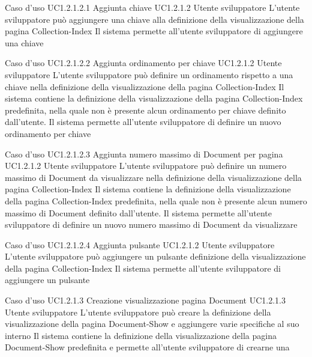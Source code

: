 \UCtitle
{Caso d'uso UC1.2.1.2.1}
{Aggiunta chiave}
\UC
{UC1.2.1.2}
{Utente sviluppatore}
{L'utente sviluppatore  può aggiungere una chiave alla definizione della visualizzazione della pagina Collection-Index}
{Il sistema permette all'utente  sviluppatore di aggiungere una chiave}


\UCtitle
{Caso d'uso UC1.2.1.2.2}
{Aggiunta ordinamento per chiave}
\UC
{UC1.2.1.2}
{Utente sviluppatore}
{L'utente sviluppatore  può  definire un ordinamento rispetto a una chiave nella definizione della visualizzazione della pagina Collection-Index}
{Il sistema contiene la definizione della visualizzazione della pagina Collection-Index predefinita, nella quale non è presente alcun ordinamento per chiave definito dall'utente. Il sistema permette all'utente  sviluppatore di definire un nuovo ordinamento per chiave}

\UCtitle
{Caso d'uso UC1.2.1.2.3}
{Aggiunta numero massimo di Document per pagina}
\UC
{UC1.2.1.2}
{Utente sviluppatore}
{L'utente sviluppatore  può definire un numero massimo di Document da visualizzare nella definizione della visualizzazione della pagina Collection-Index}
{Il sistema contiene la definizione della visualizzazione della pagina Collection-Index predefinita, nella quale non è presente alcun numero massimo di Document definito dall'utente. Il sistema permette all'utente  sviluppatore di definire un nuovo numero massimo di Document da visualizzare}

\UCtitle
{Caso d'uso UC1.2.1.2.4}
{Aggiunta pulsante}
\UC
{UC1.2.1.2}
{Utente sviluppatore}
{L'utente sviluppatore  può aggiungere un pulsante definizione della visualizzazione della pagina Collection-Index}
{Il sistema permette all'utente  sviluppatore di aggiungere un pulsante}


\UCtitle
{Caso d'uso UC1.2.1.3}
{Creazione visualizzazione pagina Document}
\UC
{UC1.2.1.3}
{Utente sviluppatore}
{L'utente sviluppatore  può creare la definizione della visualizzazione della pagina Document-Show e aggiungere varie specifiche al suo interno}
{Il sistema contiene la definizione della visualizzazione della pagina Document-Show predefinita e permette all'utente sviluppatore di crearne una}

